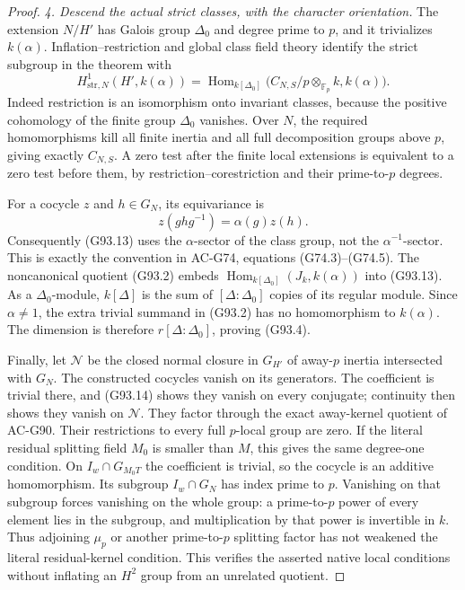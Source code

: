\begin{proof}
\emph{4. Descend the actual strict classes, with the character orientation.}
The extension \(N/H'\) has Galois group \(\Delta_0\) and degree
prime to \(p\), and it trivializes \(k(\alpha)\).
Inflation--restriction and global class field theory identify the
strict subgroup in the theorem with
\[
 H^1_{\mathrm{str},N}(H',k(\alpha))
  =\operatorname{Hom}_{k[\Delta_0]}
       \bigl(C_{N,S}/p\otimes_{\mathbb F_p}k,k(\alpha)\bigr).
 \tag{G93.13}
\]
Indeed restriction is an isomorphism onto invariant classes,
because the positive cohomology of the finite group \(\Delta_0\)
vanishes.  Over \(N\), the required homomorphisms kill all finite
inertia and all full decomposition groups above \(p\), giving
exactly \(C_{N,S}\).  A zero test after the finite local
extensions is equivalent to a zero test before them, by
restriction--corestriction and their prime-to-\(p\) degrees.

For a cocycle \(z\) and \(h\in G_N\), its equivariance is
\[
 z(g h g^{-1})=\alpha(g)z(h).
 \tag{G93.14}
\]
Consequently (G93.13) uses the \(\alpha\)-sector of the class
group, not the \(\alpha^{-1}\)-sector.  This is exactly the
convention in AC-G74, equations (G74.3)--(G74.5).
The noncanonical quotient (G93.2) embeds
\(\operatorname{Hom}_{k[\Delta_0]}(J_k,k(\alpha))\) into (G93.13).
As a \(\Delta_0\)-module, \(k[\Delta]\) is the sum of
\([\Delta:\Delta_0]\) copies of its regular module.
Since \(\alpha\ne1\), the extra trivial summand in (G93.2)
has no homomorphism to \(k(\alpha)\).  The dimension is therefore
\(r[\Delta:\Delta_0]\), proving (G93.4).

Finally, let \(\mathcal N\) be the closed normal closure in
\(G_{H'}\) of away-\(p\) inertia intersected with \(G_N\).
The constructed cocycles vanish on its generators.  The coefficient
is trivial there, and (G93.14) shows they vanish on every conjugate;
continuity then shows they vanish on \(\mathcal N\).
They factor through the exact away-kernel quotient of AC-G90.
Their restrictions to every full \(p\)-local group are zero.
If the literal residual splitting field \(M_0\) is smaller than
\(M\), this gives the same degree-one condition.  On
\(I_w\cap G_{M_0T}\) the coefficient is trivial, so the cocycle
is an additive homomorphism.  Its subgroup
\(I_w\cap G_N\) has index prime to \(p\).  Vanishing on that
subgroup forces vanishing on the whole group: a prime-to-\(p\)
power of every element lies in the subgroup, and multiplication
by that power is invertible in \(k\).  Thus adjoining \(\mu_p\)
or another prime-to-\(p\) splitting factor has not weakened the
literal residual-kernel condition.
This verifies the asserted native local conditions without
inflating an \(H^2\) group from an unrelated quotient.
\end{proof}

